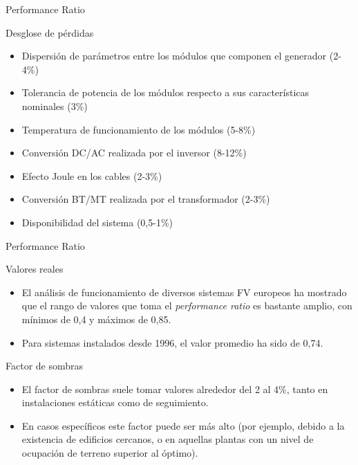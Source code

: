 \documentclass[xcolor={usenames,svgnames,dvipsnames}]{beamer}
\begin{document}
\begin{frame}[label=sec-1-1-5]{Performance Ratio}
\begin{block}{Desglose de pérdidas}
\begin{itemize}
\item \alert{Dispersión de parámetros} entre los módulos que componen el
generador (2-4\%)

\item \alert{Tolerancia de potencia} de los módulos respecto a sus
características nominales (3\%)

\item \alert{Temperatura} de funcionamiento de los módulos (5-8\%)

\item Conversión DC/AC realizada por el \alert{inversor} (8-12\%)

\item \alert{Efecto Joule} en los cables (2-3\%)

\item Conversión BT/MT realizada por el \alert{transformador} (2-3\%)

\item \alert{Disponibilidad} del sistema (0,5-1\%)
\end{itemize}
\end{block}
\end{frame}

\begin{frame}[label=sec-1-1-6]{Performance Ratio}
\begin{block}{Valores reales}
\begin{itemize}
\item El análisis de funcionamiento de diversos sistemas FV europeos ha
mostrado que el rango de valores que toma el \emph{performance ratio} es
bastante amplio, con mínimos de 0,4 y máximos de 0,85.

\item Para sistemas instalados desde 1996, \alert{el valor promedio ha sido de
0,74}.
\end{itemize}
\end{block}
\end{frame}

\begin{frame}[label=sec-1-1-7]{Factor de sombras}
\begin{itemize}
\item \alert{El factor de sombras suele tomar valores alrededor del 2 al 4\%},
tanto en instalaciones estáticas como de seguimiento.

\item En casos específicos este factor puede ser más alto (por ejemplo,
debido a la existencia de edificios cercanos, o en aquellas plantas
con un nivel de ocupación de terreno superior al óptimo).
\end{itemize}
\end{frame}
\end{document}
